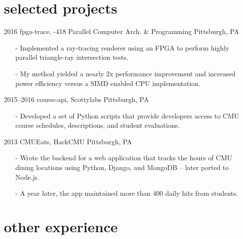 \documentclass[]{friggeri-cv}
\begin{document}
    \section{selected projects}

    \begin{entrylist}
        \entrys
            {2016}
            {fpga-trace, {-418 Parallel Computer Arch. \& Programming}}
            {Pittsburgh, PA}
            {\begin{itemize}[leftmargin=*]
                \item[-] Implemented a ray-tracing renderer using an FPGA to perform highly parallel triangle-ray intersection tests.
                \item[-] My method yielded a nearly 2x performance improvement and increased power efficiency versus a SIMD enabled CPU implementation.
            \end{itemize}}
        \entrys
            {2015--2016}
            {course-api, {\normalfont Scottylabs}}
            {Pittsburgh, PA}
            {\begin{itemize}[leftmargin=*]
                \item[-] Developed a set of Python scripts that provide developers access to CMU course schedules, descriptions, and student evaluations.
            \end{itemize}}
        \entrys
            {2013}
            {CMUEats, {\normalfont HackCMU}}
            {Pittsburgh, PA}
            {\begin{itemize}[leftmargin=*]
                \item[-] Wrote the backend for a web application that tracks the hours of CMU dining locations using Python, Django, and MongoDB -- later ported to Node.js.
                \item[-] A year later, the app maintained more than 400 daily hits from students.
            \end{itemize}}
    \end{entrylist}

    \section{other experience}
\end{document}
